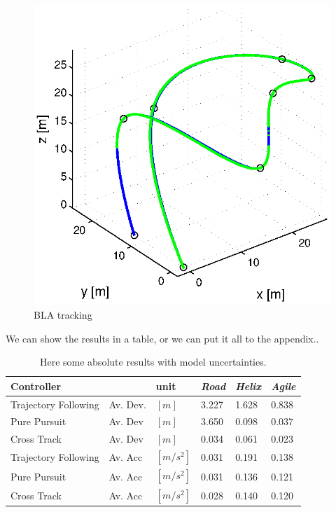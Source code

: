 \begin{figure}[h]
  \hfill
  \begin{minipage}[t]{0.32\textwidth}
    \includegraphics[width = \textwidth]{trackings_wc/figure_3D_agile_SplineDegree3_crossTrack_Disturbance_0}
  \end{minipage}
  \caption{BLA tracking }
  \label{fig:results_model_uncertainties}
\end{figure}

We can show the results in a table, or we can put it all to the appendix..

\begin{table}[h]
\begin{center}
 \begin{tabular}{lll|lll}
 \hline
 Controller &   & unit & \textit{Road} & \textit{Helix} & \textit{Agile} \\ \hline \hline
 Trajectory Following & Av. Dev. & $[m]$ & 3.227 & 1.628 & 0.838 \\
 Pure Pursuit         & Av. Dev & $[m]$ & 3.650 & 0.098 & 0.037 \\
 Cross Track          & Av. Dev & $[m]$ &  0.034 & 0.061 & 0.023 \\
    
 Trajectory Following & Av. Acc & $[m/s^2]$ & 0.031 & 0.191 & 0.138 \\
 Pure Pursuit         & Av. Acc & $[m/s^2]$ & 0.031 & 0.136 & 0.121 \\
 Cross Track          & Av. Acc & $[m/s^2]$ & 0.028 & 0.140 & 0.120 \\
 \hline
 \end{tabular}
 \caption{Here some absolute results with model uncertainties.}\vspace{1px}
 \label{tab:absolute_results}
\end{center}
\end{table}

